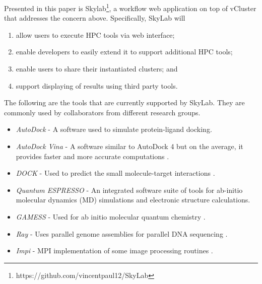 Presented in this paper is Skylab\footnote{https://github.com/vincentpaul12/SkyLab}, a workflow web application on top of vCluster that addresses the concern above. Specifically, SkyLab will  

\begin{enumerate}
	\item allow users to execute HPC tools via web interface; 
	\item enable developers to easily extend it to support additional HPC tools;
	\item enable users to share their instantiated clusters; and
	\item support displaying of results using third party tools.
\end{enumerate}
   
The following are the tools that are currently supported by SkyLab. They are commonly used by collaborators from different research groups.

\begin{itemize}
    	\item \textit{AutoDock} - A software used to simulate protein-ligand docking\cite{morris2009autodock4}.

        \item \textit{AutoDock Vina} - A software similar to AutoDock 4 but on the average, it provides faster and more accurate computations \cite{JCC:JCC21334}. 
            
		\item \textit{DOCK} - Used to predict the small molecule-target interactions    \cite{lang2009dock}.
            
      	\item \textit{Quantum ESPRESSO} - An integrated software suite of tools for ab-initio molecular dynamics (MD) simulations and electronic structure calculations\cite{QE-2009}.

  		\item \textit{GAMESS} - Used for ab initio molecular quantum chemistry  \cite{1993gamess}.
            
 	    \item \textit{Ray} - Uses parallel genome assemblies for parallel DNA sequencing \cite{boisvert_ray_2012}.
 	    
 	    \item \textit{Impi} - MPI implementation of some image processing routines \cite{trajano2010}. 

\end{itemize}   

